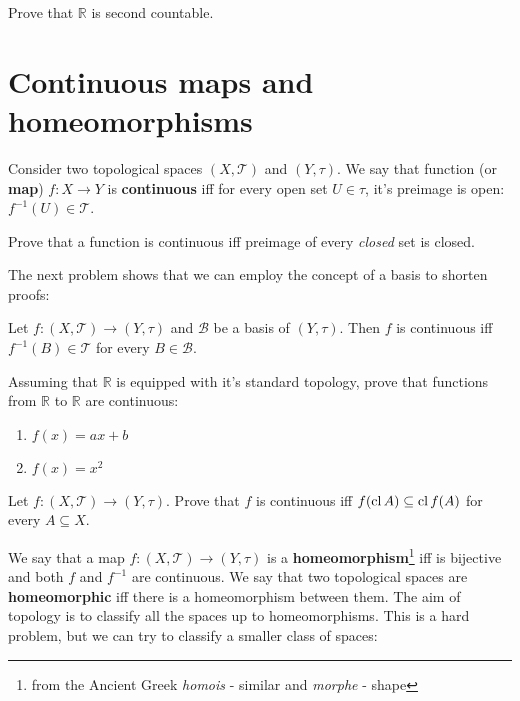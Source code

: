 \begin{prob}
  Prove that $\mathbb R$ is second countable.
\end{prob}

\section{Continuous maps and homeomorphisms}
Consider two topological spaces $(X,\mathcal T)$ and $(Y, \tau)$.
We say that function (or \textbf{map}) $f:X\to Y$ is \textbf{continuous} iff for every
open set $U\in \tau$, it's preimage is open: $f^{-1}(U)\in \mathcal T$.

\begin{prob}
  Prove that a function is continuous iff preimage of every \textit{closed} set is closed.
\end{prob}

The next problem shows that we can employ the concept of a basis to
shorten proofs:

\begin{prob}
  Let $f: (X,\mathcal T)\to (Y, \tau)$ and $\mathcal B$ be a basis of
  $(Y, \tau)$. Then $f$ is continuous iff $f^{-1}(B)\in \mathcal T$ for every $B\in \mathcal B$.
\end{prob}

\begin{prob}
  Assuming that $\mathbb R$ is equipped with it's standard topology,
  prove that functions from $\mathbb R$ to $\mathbb R$ are continuous:
  \begin{enumerate}
    \item $f(x)=ax+b$
    \item $f(x)=x^2$
  \end{enumerate}
\end{prob}

\begin{prob}
  Let $f: (X,\mathcal T)\to (Y, \tau)$. Prove that $f$ is continuous
  iff $f(\text{cl\,} A)\subseteq \text{cl\,} f(A)$ for every $A\subseteq X$.
\end{prob}

We say that a map $f: (X,\mathcal T)\to (Y, \tau)$ is a \textbf{homeomorphism}\footnote{from the Ancient Greek \textit{homois} - similar and \textit{morphe} - shape} iff is bijective and both $f$ and $f^{-1}$ are continuous. We say that two topological spaces are \textbf{homeomorphic} iff there is a homeomorphism between them. The aim of topology is to classify all the spaces up to homeomorphisms. This is a hard problem, but we can try to classify a smaller class of spaces:

